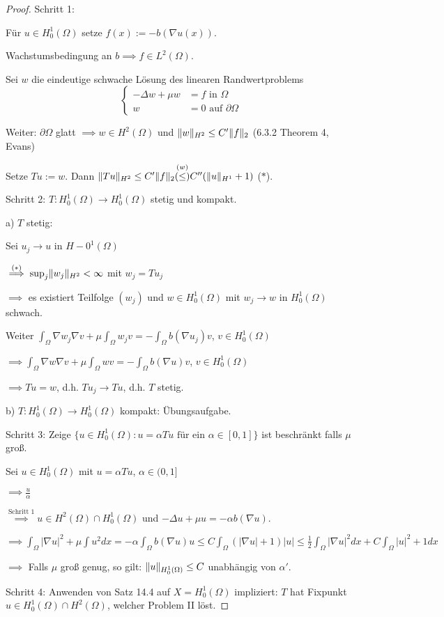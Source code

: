 \begin{proof}
  Schritt 1:

  Für $u \in H_0^1(\Omega)$ setze $f(x) := -b (\nabla u(x))$.

  Wachstumsbedingung an $b \implies f \in L^2(\Omega)$.

  Sei $w$ die eindeutige schwache Lösung des linearen Randwertproblems
  $$
  \begin{cases}
    -\Delta w + \mu w &= f \text{ in } \Omega \\
    w &= 0 \text{ auf } \partial \Omega
  \end{cases}
  $$

  Weiter: $\partial \Omega$ glatt $\implies w \in H^2(\Omega)$ und $\lVert w \rVert_{H^2} \leq C'\lVert f \rVert_2$ (6.3.2 Theorem 4,  Evans)

  Setze $T u := w.$ Dann $\lVert Tu \rVert_{H^2}  \leq C'\lVert f \rVert_2 \overset{(w)}{(\leq)} C''(\lVert u \rVert_{H^1} + 1)$ ($\ast$).

  Schritt 2: $T \colon H_0^1(\Omega) \to H_0^1(\Omega)$ stetig und kompakt.

  a) $T$ stetig: 

  Sei $u_j \to u$ in $H-0^1(\Omega)$

  $\overset{(\ast)}{\implies} \sup_j \lVert w_j \rVert_{H^2} < \infty$ mit $w_j = T u_j$

  $\implies$ es existiert Teilfolge $(w_j)$ und $w \in H_0^1(\Omega)$ mit $w_j \to w$ in $H_0^1(\Omega)$ schwach.

  Weiter $\int_\Omega \nabla w_j \nabla v + \mu \int_\Omega w_j v = - \int_\Omega b(\nabla u_j) v$, $v \in H_0^1(\Omega)$

  $\implies \int_\Omega \nabla w \nabla v + \mu \int_\Omega w v = - \int_\Omega b(\nabla u) v$, $v \in H_0^1(\Omega)$

  $\implies Tu = w$, d.h. $T u_j \to T u$, d.h. $T$ stetig.

  b) $T: H_0^1(\Omega) \to H_0^1(\Omega)$ kompakt: Übungsaufgabe.

  Schritt 3: Zeige 
  $
    \{ u \in H_0^1(\Omega) \colon u = \alpha Tu \text{ für ein } \alpha \in [0,1] \}
  $
  ist beschränkt falls $\mu$ groß.

  Sei $u \in H_0^1(\Omega)$ mit $u = \alpha Tu$, $\alpha \in (0,1]$

  $\implies \frac{u}{\alpha}$

  $\overset{\text{Schritt 1}}{\implies} u \in H^2(\Omega) \cap H_0^1(\Omega)$ und $-\Delta u + \mu u = -\alpha b(\nabla u).$

  $\implies \int_\Omega |\nabla u|^2 + \mu \int u^2 dx = -\alpha \int_\Omega b(\nabla u) u \leq C\int_\Omega (|\nabla u| + 1) |u| \leq \frac{1}{2} \int_\Omega |\nabla u|^2 dx + C\int_\Omega |u|^2 + 1 dx$

  $\implies$ Falls $\mu$ groß genug, so gilt: $\lVert u \rVert_{H_0^1(\Omega)} \leq C$ unabhängig von $\alpha'$.

  Schritt 4: Anwenden von Satz 14.4 auf $X = H_0^1(\Omega)$ impliziert: $T$ hat Fixpunkt $u \in H_0^1(\Omega) \cap H^2(\Omega)$, welcher Problem II löst.
\end{proof}


